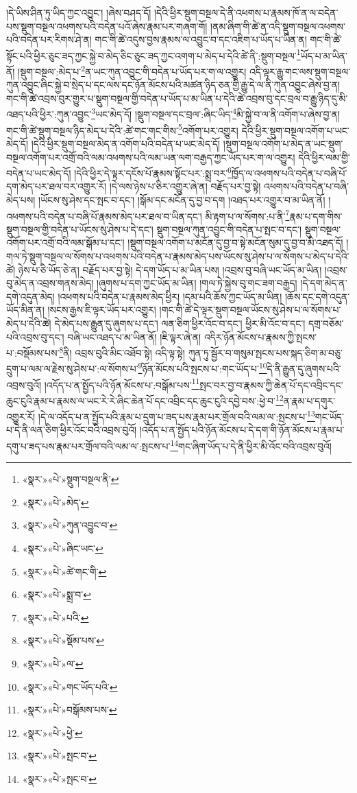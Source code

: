 །དེ་ཡིས་ཤིན་ཏུ་ཡིད་ཀྱང་འབྱུང་། །ཞེས་བཤད་དོ། །དེའི་ཕྱིར་སྡུག་བསྔལ་དེ་ནི་འཕགས་པ་རྣམས་ཁོ་ན་ལ་བདེན་པས་སྡུག་བསྔལ་འཕགས་པའི་བདེན་པའོ་ཞེས་རྣམ་པར་གཞག་གོ། །ནམ་ཞིག་གི་ཚེ་ན་འདི་སྡུག་བསྔལ་འཕགས་པའི་བདེན་པར་རིགས་ཤེ་ན། གང་གི་ཚེ་འདུས་བྱས་རྣམས་ལ་འབྱུང་བ་དང་འཇིག་པ་ཡོད་པ་ཡིན་ན། གང་གི་ཚེ་སྟོང་པའི་ཕྱིར་ཅུང་ཟད་ཀྱང་སྐྱེ་བ་མེད་ཅིང་ཅུང་ཟད་ཀྱང་འགག་པ་མེད་པ་དེའི་ཚེ་ནི་:སྡུག་བསྔལ་\footnote{«སྣར་»«པེ་»སྡུག་བསྔལ་ནི་}ཡོད་པ་མ་ཡིན་ནོ། །སྡུག་བསྔལ་:མེད་པ་\footnote{«སྣར་»«པེ་»མེད་}ན་ཡང་ཀུན་འབྱུང་གི་བདེན་པ་ཡོད་པར་ག་ལ་འགྱུར། འདི་ལྟར་རྒྱུ་གང་ལས་སྡུག་བསྔལ་ཀུན་འབྱུང་ཞིང་སྐྱེ་བ་སྲེད་པ་དང་ལས་དང་ཉོན་མོངས་པའི་མཚན་ཉིད་ཅན་གྱི་རྒྱུ་དེ་ལ་ནི་ཀུན་འབྱུང་ཞེས་བྱ་ན། གང་གི་ཚེ་འབྲས་བུར་གྱུར་པ་སྡུག་བསྔལ་གྱི་བདེན་པ་ཡོད་པ་མ་ཡིན་པ་དེའི་ཚེ་འབྲས་བུ་དང་བྲལ་བ་རྒྱུ་ཉིད་དུ་མི་འཐད་པའི་ཕྱིར་:ཀུན་འབྱུང་\footnote{«སྣར་»«པེ་»ཀུན་འབྱུང་བ་}ཡང་མེད་དོ། །སྡུག་བསྔལ་དང་བྲལ་:ཞིང་ཡིད་\footnote{«སྣར་»«པེ་»ཞིང་ཡང་}མི་སྐྱེ་བ་ལ་ནི་འགོག་པ་ཞེས་བྱ་ན། གང་གི་ཚེ་སྡུག་བསྔལ་ཉིད་མེད་པ་དེའི་:ཚེ་གང་གང་གིས་\footnote{«སྣར་»«པེ་»ཚེ་གང་གི་}འགོག་པར་འགྱུར། དེའི་ཕྱིར་སྡུག་བསྔལ་འགོག་པ་ཡང་མེད་དོ། །དེའི་ཕྱིར་སྡུག་བསྔལ་མེད་ན་འགོག་པའི་བདེན་པ་ཡང་མེད་དོ། །སྡུག་བསྔལ་འགོག་པ་མེད་ན་ཡང་སྡུག་བསྔལ་འགོག་པར་འགྲོ་བའི་ལམ་འཕགས་པའི་ལམ་ཡན་ལག་བརྒྱད་ཀྱང་ཡོད་པར་ག་ལ་འགྱུར། དེའི་ཕྱིར་ལམ་གྱི་བདེན་པ་ཡང་མེད་དོ། །དེའི་ཕྱིར་དེ་ལྟར་དངོས་པོ་རྣམས་སྟོང་པར་:སྨྲ་བར་\footnote{«སྣར་»«པེ་»སྨྲ་བ་}ཁྱོད་ལ་འཕགས་པའི་བདེན་པ་བཞི་པོ་དག་མེད་པར་ཐལ་བར་འགྱུར་རོ། །དེ་ལས་ཉེས་པ་ཅིར་འགྱུར་ཞེ་ན། བརྗོད་པར་བྱ་སྟེ། འཕགས་པའི་བདེན་པ་བཞི་མེད་པས། །ཡོངས་སུ་ཤེས་དང་སྤང་བ་དང་། །སྒོམ་དང་མངོན་དུ་བྱ་བ་དག །འཐད་པར་འགྱུར་བ་མ་ཡིན་ནོ། །འཕགས་པའི་བདེན་པ་བཞི་པོ་རྣམས་མེད་པར་ཐལ་བ་ཡིན་དང་། མི་རྟག་པ་ལ་སོགས་:པ་ནི་\footnote{«སྣར་»«པེ་»པའི་}རྣམ་པ་དག་གིས་སྡུག་བསྔལ་གྱི་བདེན་པ་ཡོངས་སུ་ཤེས་པ་དེ་དང་། སྡུག་བསྔལ་ཀུན་འབྱུང་གི་བདེན་པ་སྤང་བ་དང་། སྡུག་བསྔལ་འགོག་པར་འགྲོ་བའི་ལམ་སྒོམ་པ་དང་། །སྡུག་བསྔལ་འགོག་པ་མངོན་དུ་བྱ་བ་སྟེ་མངོན་སུམ་དུ་བྱ་བ་མི་འཐད་དོ། །གལ་ཏེ་སྡུག་བསྔལ་ལ་སོགས་པ་འཕགས་པའི་བདེན་པ་རྣམས་མེད་པས་ཡོངས་སུ་ཤེས་པ་ལ་སོགས་པ་མེད་པ་དེའི་ཚེ། ཉེས་པ་ཅི་ཡོད་ཅེ་ན། བརྗོད་པར་བྱ་སྟེ། དེ་དག་ཡོད་པ་མ་ཡིན་པས། །འབྲས་བུ་བཞི་ཡང་ཡོད་མ་ཡིན། །འབྲས་བུ་མེད་ན་འབྲས་གནས་མེད། །ཞུགས་པ་དག་ཀྱང་ཡོད་མ་ཡིན། །གལ་ཏེ་སྐྱེས་བུ་གང་ཟག་བརྒྱད། །དེ་དག་མེད་ན་དགེ་འདུན་མེད། །འཕགས་པའི་བདེན་པ་རྣམས་མེད་ཕྱིར། །དམ་པའི་ཆོས་ཀྱང་ཡོད་མ་ཡིན། །ཆོས་དང་དགེ་འདུན་ཡོད་མིན་ན། །སངས་རྒྱས་ཇི་ལྟར་ཡོད་པར་འགྱུར། །གང་གི་ཚེ་དེ་ལྟར་སྡུག་བསྔལ་ཡོངས་སུ་ཤེས་པ་ལ་སོགས་པ་མེད་པ་དེའི་ཚེ། དེ་མེད་པས་རྒྱུན་དུ་ཞུགས་པ་དང་། ལན་ཅིག་ཕྱིར་འོང་བ་དང་། ཕྱིར་མི་འོང་བ་དང་། དགྲ་བཅོམ་པའི་འབྲས་བུ་དང་། བཞི་ཡང་འཐད་པ་མ་ཡིན་ནོ། །ཇི་ལྟར་ཞེ་ན། འདིར་ཉོན་མོངས་པ་རྣམས་ཀྱི་སྤངས་པ་:བསྡོམས་པས་\footnote{«སྣར་»«པེ་»སྡོམ་པས་}ནི། འབྲས་བུའི་མིང་འཐོབ་སྟེ། འདི་ལྟ་སྟེ། ཀུན་ཏུ་སྦྱོར་བ་གསུམ་སྤངས་པས་སྐད་ཅིག་མ་བཅུ་དྲུག་པ་ལམ་ལ་རྗེས་སུ་ཤེས་པ་:ལ་སོགས་པ་\footnote{«སྣར་»«པེ་»ལ་}ཉོན་མོངས་པའི་སྤངས་པ་:གང་ཡོད་པ་\footnote{«སྣར་»«པེ་»གང་ཡོད་པའི་}དེ་ནི་རྒྱུན་དུ་ཞུགས་པའི་འབྲས་བུའོ། །འདོད་པ་ན་སྤྱོད་པའི་ཉོན་མོངས་པ་:བསྒོམ་པས་\footnote{«སྣར་»«པེ་»བསྒོམས་པས་}སྤང་བར་བྱ་བ་རྣམས་ཀྱི་ཆེན་པོ་དང་འབྲིང་དང་ཆུང་ངུའི་རྣམ་པ་རྣམས་ལ་ཡང་རེ་རེ་ཞིང་ཆེན་པོ་དང་འབྲིང་དང་ཆུང་ངུའི་དབྱེ་བས་:ཕྱེ་བ་\footnote{«སྣར་»«པེ་»ཕྱེ་}ན་རྣམ་པ་དགུར་འགྱུར་རོ། །དེ་ལ་འདོད་པ་ན་སྤྱོད་པའི་རྣམ་པ་དྲུག་པ་ཟད་པས་རྣམ་པར་གྲོལ་བའི་ལམ་ལ་:སྤངས་པ་\footnote{«སྣར་»«པེ་»སྤང་བ་}གང་ཡོད་པ་དེ་ནི་ལན་ཅིག་ཕྱིར་འོང་བའི་འབྲས་བུའོ། །འདོད་པ་ན་སྤྱོད་པའི་ཉོན་མོངས་པ་དེ་དག་གི་ཉོན་མོངས་པ་རྣམ་པ་དགུ་པ་ཟད་པས་རྣམ་པར་གྲོལ་བའི་ལམ་ལ་:སྤངས་པ་\footnote{«སྣར་»«པེ་»སྤང་བ་}གང་ཞིག་ཡོད་པ་དེ་ནི་ཕྱིར་མི་འོང་བའི་འབྲས་བུའོ། 